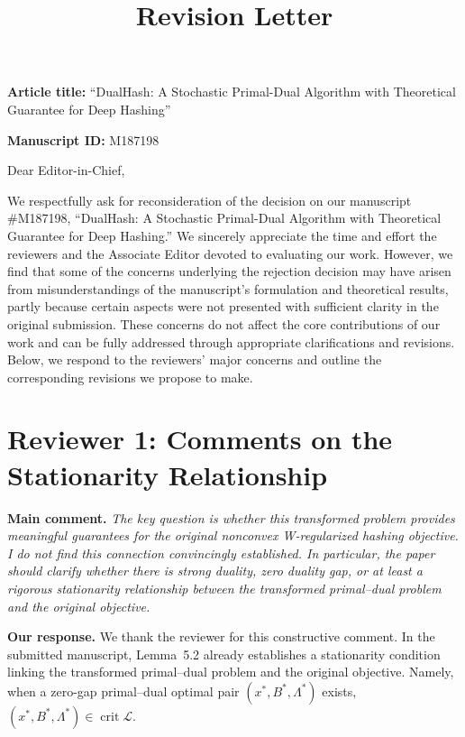 \documentclass[11pt]{article}
\title{Revision Letter}
\author{}
\date{}
\begin{document}
\maketitle

\vspace{0.5em}
\noindent\textbf{Article title:} ``DualHash: A Stochastic Primal-Dual Algorithm with Theoretical Guarantee for Deep Hashing''

\vspace{0.5em}
\noindent\textbf{Manuscript ID:} M187198

\vspace{0.5em}
\noindent Dear Editor-in-Chief,

We respectfully ask for reconsideration of the decision on our manuscript
\#M187198, ``DualHash: A Stochastic Primal-Dual Algorithm with Theoretical
Guarantee for Deep Hashing.'' We sincerely appreciate the time and effort the reviewers and the Associate Editor devoted to evaluating our work. However, we find that some of the concerns underlying the rejection decision may have arisen from misunderstandings of the manuscript’s formulation and theoretical results, partly because certain aspects were not presented with sufficient clarity in the original submission. These concerns do not affect the core contributions of our work and can be fully addressed through appropriate clarifications and revisions. Below, we respond to the reviewers’ major concerns and outline the corresponding revisions we propose to make. 


\section{Reviewer 1: Comments on the Stationarity Relationship}

\vspace{0.5em}
\noindent\textbf{Main comment.} \emph{%
The key question is whether this transformed problem provides meaningful guarantees for the original nonconvex W-regularized hashing objective. I do not find this connection convincingly established. In particular, the paper should clarify whether there is strong duality, zero duality gap, or at least a rigorous stationarity relationship between the transformed primal--dual problem and the original objective.}

\vspace{0.5em}
\noindent\textbullet\quad\textbf{{Our response.} }
We thank the reviewer for this constructive comment. In the submitted manuscript, Lemma~5.2 already establishes a stationarity condition linking the transformed primal--dual problem and the original objective. 
Namely, when a zero-gap primal--dual optimal pair $(x^*,B^*,\Lambda^*)$
exists, $(x^*,B^*,\Lambda^*)\in\operatorname{crit}\mathcal{L}$. 
\end{document}
